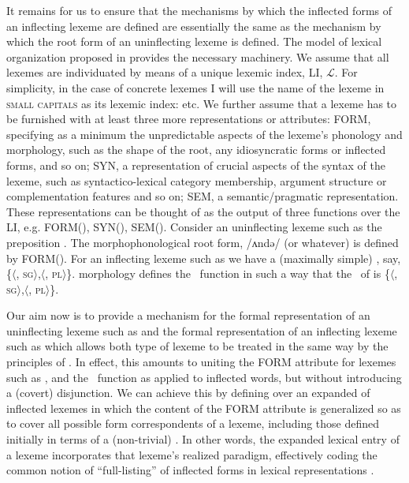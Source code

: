 \documentclass[output=paper,colorlinks,citecolor=brown]{langscibook}
\begin{document}
It remains for us to ensure that the mechanisms by which the inflected forms of an inflecting lexeme are defined are essentially the same as the  mechanism by which the root form of an uninflecting lexeme is defined. The model of lexical organization proposed in \citet{spencer2013} provides the necessary machinery. We assume that all lexemes are individuated by means of a unique lexemic index,  LI, $\mathcal{L}$. For simplicity, in the case of concrete lexemes I will use the name of the lexeme in \textsc{small capitals} as its lexemic index:  etc. We further assume that  a lexeme has to be furnished  with at least three more representations or attributes: %
FORM, specifying as a minimum the unpredictable aspects of the lexeme's phonology and morphology, such as the shape of the root, any idiosyncratic  forms or inflected forms, and so on; %
SYN, a representation of crucial aspects of the syntax of the lexeme, such as syntactico-lexical category membership, argument structure or complementation features and so on; %
SEM, a semantic/pragmatic representation. These representations can be thought of as the output of three functions over the LI, e.g. FORM(), SYN(), SEM(). Consider an uninflecting lexeme such as the preposition . The morphophonological root form, /ʌndə/ (or whatever) is defined by FORM(). For an inflecting lexeme such as  we have a (maximally simple) \PC, say, \{$\langle$, \textsc{sg}$\rangle$,$\langle$, \textsc{pl}$\rangle$\}.  morphology defines the \Corr\ function in such a way that the \PR\ of  is \{$\langle$, \textsc{sg}$\rangle$,$\langle$, \textsc{pl}$\rangle$\}. 

Our aim now is to provide a mechanism for the formal representation of an uninflecting lexeme such as  and the formal representation of an inflecting lexeme such as  which allows both type of lexeme to be treated in the same way by the principles of . In effect, this amounts to uniting  the FORM attribute for lexemes such as , and the \Corr\ function as applied to inflected words, but without introducing a (covert) disjunction. We can achieve this by defining  over an expanded  of inflected lexemes in which   the content of the FORM attribute is  generalized so as to cover all possible form correspondents of a lexeme, including those defined initially in terms of a (non-trivial) \PC. In other words, the expanded lexical entry of a lexeme incorporates that lexeme's realized paradigm, effectively coding the common notion of ``full-listing'' of inflected forms in lexical representations \citep{butterworth1983}.  
\end{document}
